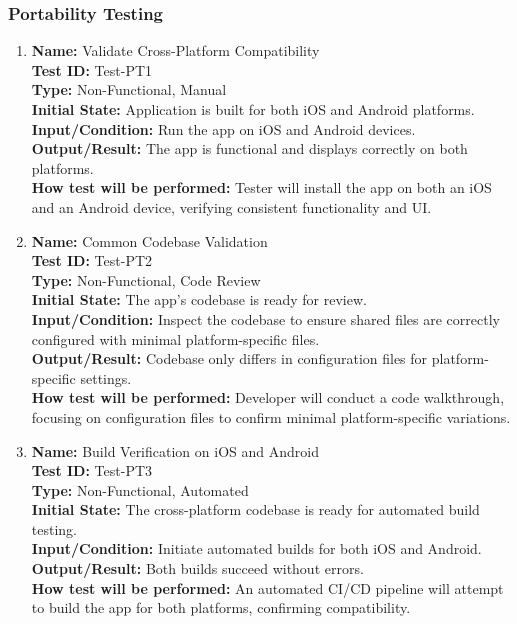 \documentclass[12pt, titlepage]{article}
\begin{document}
\subsubsection{Portability Testing}

\begin{enumerate}

  \item \textbf{Name:} Validate Cross-Platform Compatibility \label{itm:Test-PT1} \\
        \textbf{Test ID:} Test-PT1 \\
        \textbf{Type:} Non-Functional, Manual \\
        \textbf{Initial State:} Application is built for both iOS and Android platforms. \\
        \textbf{Input/Condition:} Run the app on iOS and Android devices. \\
        \textbf{Output/Result:} The app is functional and displays correctly on both platforms. \\
        \textbf{How test will be performed:} Tester will install the app on both an iOS and an Android device, verifying consistent functionality and UI.

  \item \textbf{Name:} Common Codebase Validation \label{itm:Test-PT2} \\
        \textbf{Test ID:} Test-PT2 \\
        \textbf{Type:} Non-Functional, Code Review \\
        \textbf{Initial State:} The app's codebase is ready for review. \\
        \textbf{Input/Condition:} Inspect the codebase to ensure shared files are correctly configured with minimal platform-specific files. \\
        \textbf{Output/Result:} Codebase only differs in configuration files for platform-specific settings. \\
        \textbf{How test will be performed:} Developer will conduct a code walkthrough, focusing on configuration files to confirm minimal platform-specific variations.

  \item \textbf{Name:} Build Verification on iOS and Android \label{itm:Test-PT3} \\
        \textbf{Test ID:} Test-PT3 \\
        \textbf{Type:} Non-Functional, Automated \\
        \textbf{Initial State:} The cross-platform codebase is ready for automated build testing. \\
        \textbf{Input/Condition:} Initiate automated builds for both iOS and Android. \\
        \textbf{Output/Result:} Both builds succeed without errors. \\
        \textbf{How test will be performed:} An automated CI/CD pipeline will attempt to build the app for both platforms, confirming compatibility.

\end{enumerate}
\end{document}
